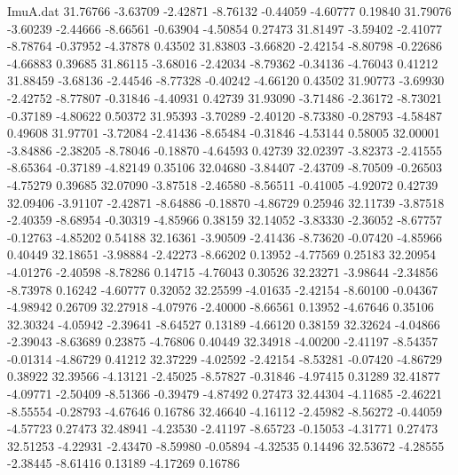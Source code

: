 \begin{filecontents}{ImuA.dat}
  31.76766   -3.63709   -2.42871   -8.76132   -0.44059   -4.60777    0.19840
  31.79076   -3.60239   -2.44666   -8.66561   -0.63904   -4.50854    0.27473
  31.81497   -3.59402   -2.41077   -8.78764   -0.37952   -4.37878    0.43502
  31.83803   -3.66820   -2.42154   -8.80798   -0.22686   -4.66883    0.39685
  31.86115   -3.68016   -2.42034   -8.79362   -0.34136   -4.76043    0.41212
  31.88459   -3.68136   -2.44546   -8.77328   -0.40242   -4.66120    0.43502
  31.90773   -3.69930   -2.42752   -8.77807   -0.31846   -4.40931    0.42739
  31.93090   -3.71486   -2.36172   -8.73021   -0.37189   -4.80622    0.50372
  31.95393   -3.70289   -2.40120   -8.73380   -0.28793   -4.58487    0.49608
  31.97701   -3.72084   -2.41436   -8.65484   -0.31846   -4.53144    0.58005
  32.00001   -3.84886   -2.38205   -8.78046   -0.18870   -4.64593    0.42739
  32.02397   -3.82373   -2.41555   -8.65364   -0.37189   -4.82149    0.35106
  32.04680   -3.84407   -2.43709   -8.70509   -0.26503   -4.75279    0.39685
  32.07090   -3.87518   -2.46580   -8.56511   -0.41005   -4.92072    0.42739
  32.09406   -3.91107   -2.42871   -8.64886   -0.18870   -4.86729    0.25946
  32.11739   -3.87518   -2.40359   -8.68954   -0.30319   -4.85966    0.38159
  32.14052   -3.83330   -2.36052   -8.67757   -0.12763   -4.85202    0.54188
  32.16361   -3.90509   -2.41436   -8.73620   -0.07420   -4.85966    0.40449
  32.18651   -3.98884   -2.42273   -8.66202    0.13952   -4.77569    0.25183
  32.20954   -4.01276   -2.40598   -8.78286    0.14715   -4.76043    0.30526
  32.23271   -3.98644   -2.34856   -8.73978    0.16242   -4.60777    0.32052
  32.25599   -4.01635   -2.42154   -8.60100   -0.04367   -4.98942    0.26709
  32.27918   -4.07976   -2.40000   -8.66561    0.13952   -4.67646    0.35106
  32.30324   -4.05942   -2.39641   -8.64527    0.13189   -4.66120    0.38159
  32.32624   -4.04866   -2.39043   -8.63689    0.23875   -4.76806    0.40449
  32.34918   -4.00200   -2.41197   -8.54357   -0.01314   -4.86729    0.41212
  32.37229   -4.02592   -2.42154   -8.53281   -0.07420   -4.86729    0.38922
  32.39566   -4.13121   -2.45025   -8.57827   -0.31846   -4.97415    0.31289
  32.41877   -4.09771   -2.50409   -8.51366   -0.39479   -4.87492    0.27473
  32.44304   -4.11685   -2.46221   -8.55554   -0.28793   -4.67646    0.16786
  32.46640   -4.16112   -2.45982   -8.56272   -0.44059   -4.57723    0.27473
  32.48941   -4.23530   -2.41197   -8.65723   -0.15053   -4.31771    0.27473
  32.51253   -4.22931   -2.43470   -8.59980   -0.05894   -4.32535    0.14496
  32.53672   -4.28555   -2.38445   -8.61416    0.13189   -4.17269    0.16786

\end{filecontents}
